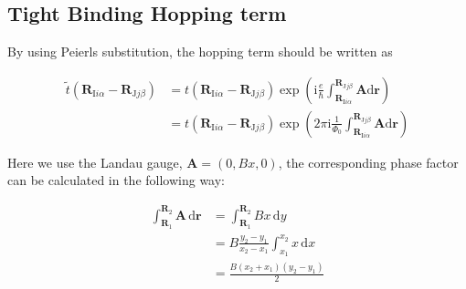 \documentclass[%
 amsmath,amssymb,
rmp,
]{revtex4-1}
\def \bA    {\mathbf{A}}
\def \I     {\mathrm{I}}
\def \J     {\mathrm{J}}
\def \i     {\mathrm{i}}
\def \bR    {\mathbf{R}}
\def \br    {\mathbf{r}}
\def \d     {\mathrm{d}}
\begin{document}
\subsection{Tight Binding Hopping term}

By using Peierls substitution, the hopping term should be written as 

\begin{equation}
\begin{aligned}
    \tilde{t}(\bR_{\I i \alpha}-\bR_{\J j \beta})&= t(\bR_{\I i \alpha}-\bR_{\J j \beta}) \exp(\i \frac{e}{\hbar} \int_{\bR_{\I i \alpha}}^{\bR_{\J j \beta}}\bA \d \br)\\
    &=t(\bR_{\I i \alpha}-\bR_{\J j \beta}) \exp(2\pi\i \frac{1}{\Phi_0} \int_{\bR_{\I i \alpha}}^{\bR_{\J j \beta}}\bA \d \br)
\end{aligned}
\end{equation}


Here we use the Landau gauge, $\bA = (0, Bx, 0)$, the corresponding phase factor can be calculated in the following way:

\begin{equation}
\begin{aligned}
\int_{\bR_1}^{\bR_2} \bA \, \d \br &= \int_{\bR_1}^{\bR_2} Bx \,\d y \\
&= B \frac{y_2-y_1}{x_2-x_1}\int_{x_1}^{x_2} x \,\d x \\
&= \frac{B(x_2+x_1)(y_2-y_1)}{2}
\end{aligned}
\end{equation}
\end{document}
